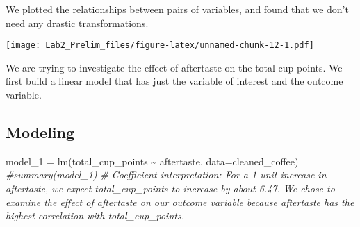 \documentclass[
]{article}
\newenvironment{Shaded}{\begin{snugshade}}{\end{snugshade}}
\newcommand{\AttributeTok}[1]{\textcolor[rgb]{0.77,0.63,0.00}{#1}}
\newcommand{\CommentTok}[1]{\textcolor[rgb]{0.56,0.35,0.01}{\textit{#1}}}
\newcommand{\DecValTok}[1]{\textcolor[rgb]{0.00,0.00,0.81}{#1}}
\newcommand{\FunctionTok}[1]{\textcolor[rgb]{0.00,0.00,0.00}{#1}}
\newcommand{\NormalTok}[1]{#1}
\newcommand{\OtherTok}[1]{\textcolor[rgb]{0.56,0.35,0.01}{#1}}
\newcommand{\SpecialCharTok}[1]{\textcolor[rgb]{0.00,0.00,0.00}{#1}}
\newcommand{\StringTok}[1]{\textcolor[rgb]{0.31,0.60,0.02}{#1}}
\begin{document}
\begin{Shaded}
\end{Shaded}

We plotted the relationships between pairs of variables, and found that
we don't need any drastic transformations.

\begin{Shaded}
\end{Shaded}

\texttt{[image: Lab2\_Prelim\_files/figure-latex/unnamed-chunk-12-1.pdf]}

We are trying to investigate the effect of aftertaste on the total cup
points. We first build a linear model that has just the variable of
interest and the outcome variable.

\hypertarget{modeling}{%
\subsection{Modeling}\label{modeling}}

\begin{Shaded}
\begin{Highlighting}[]
\NormalTok{model\_1 }\OtherTok{=} \FunctionTok{lm}\NormalTok{(total\_cup\_points }\SpecialCharTok{\textasciitilde{}}\NormalTok{ aftertaste, }\AttributeTok{data=}\NormalTok{cleaned\_coffee)}
\CommentTok{\#summary(model\_1)}
\CommentTok{\# Coefficient interpretation: For a 1 unit increase in aftertaste, we expect total\_cup\_points to increase by about 6.47. We chose to examine the effect of aftertaste on our outcome variable because aftertaste has the highest correlation with total\_cup\_points.}
\end{Highlighting}
\end{Shaded}
\end{document}
